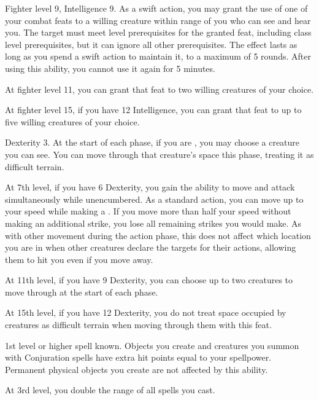     \featpres Fighter level 9, Intelligence 9.
    \featben As a swift action, you may grant the use of one of your combat feats to a willing creature within \rngmed range of you who can see and hear you.
    The target must meet level prerequisites for the granted feat, including class level prerequisites, but it can ignore all other prerequisites.
    The effect lasts as long as you spend a swift action to maintain it, to a maximum of 5 rounds.
    After using this ability, you cannot use it again for 5 minutes.

    At fighter level 11, you can grant that feat to two willing creatures of your choice.

    At fighter level 15, if you have 12 Intelligence, you can grant that feat to up to five willing creatures of your choice.

    \featpres Dexterity 3.
    \featben At the start of each phase, if you are , you may choose a creature you can see.
    You can move through that creature's space this phase, treating it as difficult terrain.

    At 7th level, if you have 6 Dexterity, you gain the ability to move and attack simultaneously while unencumbered.
    As a standard action, you can move up to your speed while making a .
    If you move more than half your speed without making an additional strike, you lose all remaining strikes you would make.
    As with other movement during the action phase, this does not affect which location you are in when other creatures declare the targets for their actions, allowing them to hit you even if you move away.

    At 11th level, if you have 9 Dexterity, you can choose up to two creatures to move through at the start of each phase.

    At 15th level, if you have 12 Dexterity, you do not treat space occupied by creatures as difficult terrain when moving through them with this feat.

    \featpres 1st level or higher  spell known.
    \featben Objects you create and creatures you summon with Conjuration spells have extra hit points equal to your spellpower.
    Permanent physical objects you create are not affected by this ability.

    At 3rd level, you double the range of all  spells you cast.

